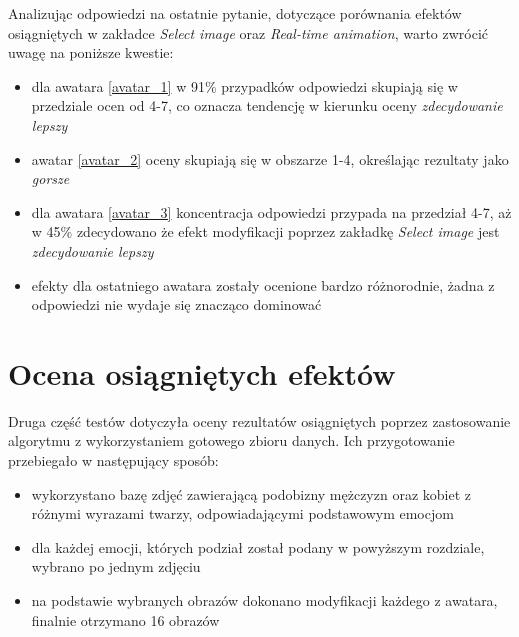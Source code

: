 Analizując odpowiedzi na ostatnie pytanie, dotyczące porównania efektów osiągniętych w zakładce \textit{Select image} oraz \textit{Real-time animation}, warto zwrócić uwagę na poniższe kwestie:
\begin{itemize}
    \item dla awatara \ref{avatar_1} w 91\% przypadków odpowiedzi skupiają się w przedziale ocen od 4-7, co oznacza tendencję w kierunku oceny \textit{zdecydowanie lepszy}
    \item awatar \ref{avatar_2} oceny skupiają się w obszarze 1-4, określając rezultaty jako \textit{gorsze}
    \item dla awatara \ref{avatar_3} koncentracja odpowiedzi przypada na przedział 4-7, aż w 45\% zdecydowano że efekt modyfikacji poprzez zakładkę \textit{Select image} jest \textit{zdecydowanie lepszy}
    \item efekty dla ostatniego awatara zostały ocenione bardzo różnorodnie, żadna z odpowiedzi nie wydaje się znacząco dominować
\end{itemize}










\section{Ocena osiągniętych efektów}
Druga część testów dotyczyła oceny rezultatów osiągniętych poprzez zastosowanie algorytmu z wykorzystaniem gotowego zbioru danych. Ich przygotowanie przebiegało w następujący sposób:
\begin{itemize}
    \item wykorzystano bazę zdjęć zawierającą podobizny mężczyzn oraz kobiet z różnymi wyrazami twarzy, odpowiadającymi podstawowym emocjom
    \item dla każdej emocji, których podział został podany w powyższym rozdziale, wybrano po jednym zdjęciu
    \item na podstawie wybranych obrazów dokonano modyfikacji każdego z awatara, finalnie otrzymano 16 obrazów
\end{itemize}

